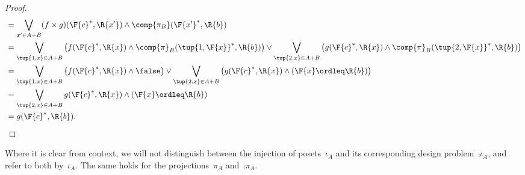 \begin{proof}
\begin{equation}
\begin{aligned}
            &=\bigvee_{x'\in A+B} (f\times g)(\F{c}^*,\R{x'}) \wedge \comp{\pi_B}(\F{x'}^*,\R{b})\\
            &=\bigvee_{\tup{1,x}\in A+B}\left( f(\F{c}^*,\R{x}) \wedge \comp{\pi}_B(\tup{1,\F{x}}^*,\R{b})\right) \vee
            \bigvee_{\tup{2,x}\in A+B}\left( g(\F{c}^*,\R{x}) \wedge \comp{\pi}_B(\tup{2,\F{x}}^*,\R{b})\right)\\
            &=\bigvee_{\tup{1,x}\in A+B}\left( f(\F{c}^*,\R{x}) \wedge \false \right) \vee
            \bigvee_{\tup{2,x}\in A+B}\left( g(\F{c}^*,\R{x}) \wedge (\F{x}\ordleq \R{b}) \right)\\
            &=\bigvee_{\tup{2,x}\in A+B} g(\F{c}^*,\R{x}) \wedge (\F{x}\ordleq \R{b}) \\
            &=g(\F{c}^*,\R{b}).
        \end{aligned}
    \end{equation}
\end{proof}

\begin{remark}
    Where it is clear from context, we will not distinguish between the injection of posets~$\iota_A$ and its corresponding design problem~$\comp{\iota_A}$, and refer to both by~$\iota_A$. The same holds for the projections~$\pi_A$ and~$\comp{\pi_A}$.
\end{remark}

